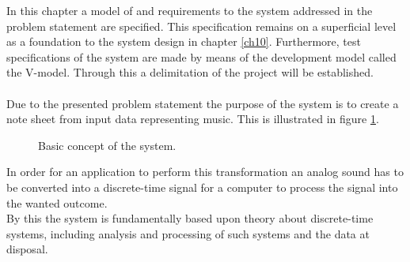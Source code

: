 In this chapter a model of and requirements to the system addressed in the problem statement are specified. This specification remains on a superficial level as a foundation to the system design in chapter \ref{ch10}. Furthermore, test specifications of the system are made by means of the development model called the V-model. Through this a delimitation of the project will be established. \\   
\\
Due to the presented problem statement the purpose of the system is to create a note sheet from input data representing music. This is illustrated in figure \ref{fig:model1}.    
\begin{figure}[H]
\centering
{}
\caption{Basic concept of the system.}
\label{fig:model1}
\end{figure}
In order for an application to perform this transformation an analog sound has to be converted into a discrete-time signal for a computer to process the signal into the wanted outcome. \\
By this the system is fundamentally based upon theory about discrete-time systems, including analysis and processing of such systems and the data at disposal.

